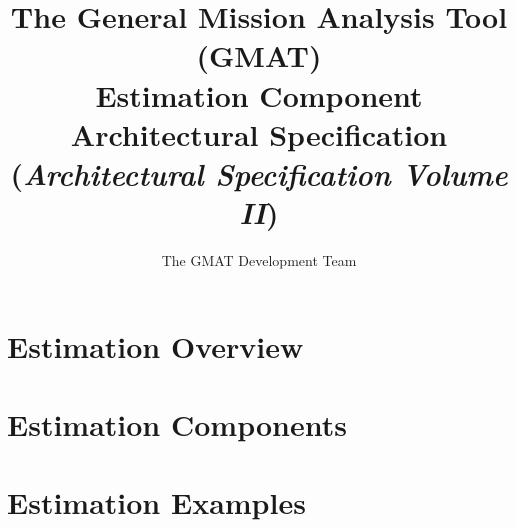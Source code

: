 \documentclass[letterpaper,10pt]{book}
\title{The General Mission Analysis Tool (GMAT)\\Estimation Component Architectural
Specification\\(\textit{Architectural Specification Volume II})}
\author{The GMAT Development Team}
\begin{document}
\newcommand\chapauthor[2]{\begin{flushleft}\emph{#1}\\\emph{#2}\end{flushleft}}


\thispagestyle{empty}

\frontmatter

\tableofcontents
\clearpage
\listoffigures



\mainmatter

\part{Estimation Overview}
\clearpage
\clearpage
\thispagestyle{empty}



\part{Estimation Components}
\thispagestyle{empty}
















\part{Estimation Examples}
\thispagestyle{empty}


\end{document}

